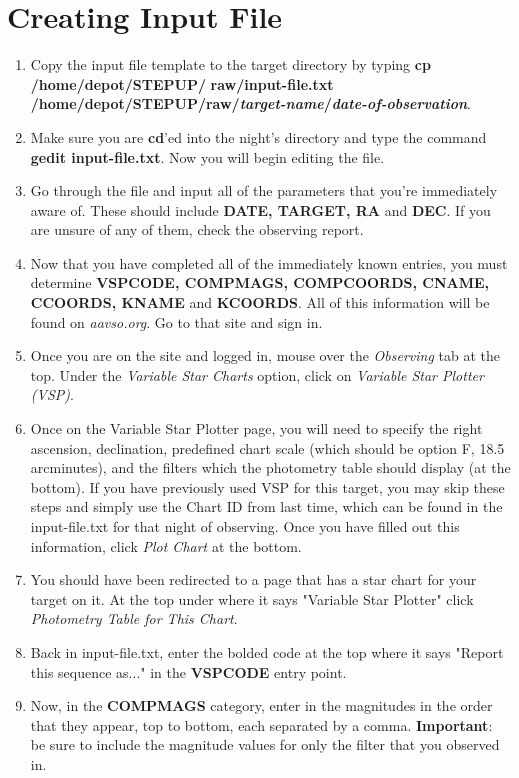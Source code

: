 \documentclass[11pt]{report}
\begin{document}
\section{Creating Input File}
\begin{enumerate}
\item Copy the input file template to the target directory by typing {\bf cp /home/depot/STEPUP/} {\bf raw/input-file.txt /home/depot/STEPUP/raw/\emph{target-name}/\emph{date-of-observation}}. 
\item Make sure you are {\bf cd}'ed into the night's directory and type the command {\bf gedit input-file.txt}. Now you will begin editing the file.
\item Go through the file and input all of the parameters that you're immediately aware of. These should include {\bf DATE, TARGET, RA} and {\bf DEC}. If you are unsure of any of them, check the observing report.
\item Now that you have completed all of the immediately known entries, you must determine {\bf VSPCODE, COMPMAGS, COMPCOORDS, CNAME, CCOORDS, KNAME} and {\bf KCOORDS}. All of this information will be found on \emph{aavso.org}. Go to that site and sign in. 
\item Once you are on the site and logged in, mouse over the \emph{Observing} tab at the top. Under the \emph{Variable Star Charts} option, click on \emph{Variable Star Plotter (VSP)}. 
\item Once on the Variable Star Plotter page, you will need to specify the right ascension, declination, predefined chart scale (which should be option F, 18.5 arcminutes), and the filters which the photometry table should display (at the bottom). If you have previously used VSP for this target, you may skip these steps and simply use the Chart ID from last time, which can be found in the input-file.txt for that night of observing. Once you have filled out this information, click \emph{Plot Chart} at the bottom.
\item You should have been redirected to a page that has a star chart for your target on it. At the top under where it says "Variable Star Plotter" click \emph{Photometry Table for This Chart}.
\item Back in input-file.txt, enter the bolded code at the top where it says "Report this sequence as..." in the {\bf VSPCODE} entry point.
\item Now, in the {\bf COMPMAGS} category, enter in the magnitudes in the order that they appear, top to bottom, each separated by a comma. \textbf{Important}: be sure to include the magnitude values for only the filter that you observed in.

\end{enumerate}
\end{document}
